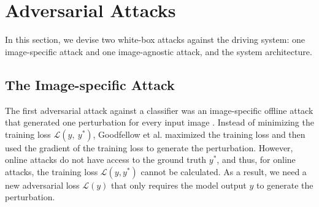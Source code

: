 
\section{Adversarial Attacks} 

In this section, we devise two white-box attacks against the driving system: one image-specific attack and one image-agnostic attack, and the system architecture. 


\subsection{The Image-specific Attack}

The first adversarial attack against a classifier was an image-specific offline attack that generated one perturbation for every input image \citep{goodfellow2014explaining}. Instead of minimizing the training loss $\mathcal{L}(y,\ y^{*})$, Goodfellow et al. maximized the training loss and then used the gradient of the training loss to generate the perturbation. However, online attacks do not have access to the ground truth $y^{*}$, and thus, for online attacks, the training loss $\mathcal{L}(y, y^{*})$ cannot be calculated. As a result, we need a new adversarial loss $\mathcal{L}(y)$ that only requires the model output $y$ to generate the perturbation.


